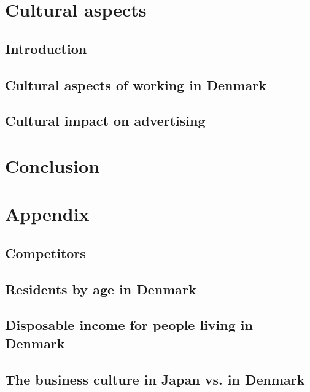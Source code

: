 \documentclass[a4paper,11pt,fleqn,dvipsnames,oneside,openright]{memoir}
\begin{document}
\chapter{Cultural aspects}
\section{Introduction}

\section{Cultural aspects of working in Denmark}

\section{Cultural impact on advertising}


\chapter{Conclusion}





\begingroup
	\raggedright
	\printbibliography
\endgroup 

\appendix
\chapter{Appendix}

\section{Competitors}
\label{Competitors}


\section{Residents by age in Denmark}
\label{ResidentsAge}


\section{Disposable income for people living in Denmark}
\label{DisposableIncome}


\section{The business culture in Japan vs. in Denmark}
\label{CultureComparison}

\end{document}
